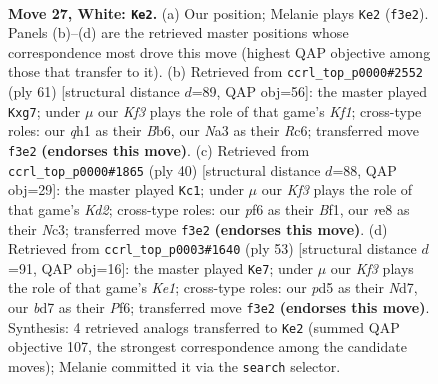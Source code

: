 \documentclass[11pt]{article}
\begin{document}
\clearpage

\begin{figure}[p]\centering
\begin{subfigure}{0.46\textwidth}\centering
\resizebox{\linewidth}{!}{%
\newchessgame
\chessboard[
  setfen={r3r3/1ppb2kp/5p2/p2p2b1/6P1/NPB1PK2/P4P2/RN5q w - - 1 27},
  showmover=false,
  pgfstyle=straightmove, color=movearrow, markmove={f3-e2}
]}
\caption{}
\end{subfigure}\hfill
\begin{subfigure}{0.46\textwidth}\centering
\resizebox{\linewidth}{!}{%
\newchessgame
\chessboard[
  setfen={5k2/pp3pQ1/1brn3p/3p2p1/P2P3P/1P2B3/5PP1/1B3RK1 b - - 0 31},
  showmover=false,
  pgfstyle=straightmove, color=movearrow, markmove={f8-g7}
]}
\caption{}
\end{subfigure}
\\[4pt]
\begin{subfigure}{0.46\textwidth}\centering
\resizebox{\linewidth}{!}{%
\newchessgame
\chessboard[
  setfen={r2r2k1/2R2pp1/p3b3/4n1Pp/4P3/2N4P/P1PK4/5B1R w - - 5 21},
  showmover=false,
  pgfstyle=straightmove, color=movearrow, markmove={d2-c1}
]}
\caption{}
\end{subfigure}\hfill
\begin{subfigure}{0.46\textwidth}\centering
\resizebox{\linewidth}{!}{%
\newchessgame
\chessboard[
  setfen={b3k2r/3n2p1/4pp2/1N1pn2p/2P2B2/6PP/2P5/2KRR3 b k - 0 27},
  showmover=false,
  pgfstyle=straightmove, color=movearrow, markmove={e8-e7}
]}
\caption{}
\end{subfigure}
\caption{\textbf{Move 27, White: \texttt{Ke2}.} (a) Our position; Melanie plays \texttt{Ke2} (\texttt{f3e2}). Panels (b)--(d) are the retrieved master positions whose correspondence most drove this move (highest QAP objective among those that transfer to it). (b) Retrieved from \texttt{ccrl\_top\_p0000\#2552} (ply 61) [structural distance $d$=89, QAP obj=56]: the master played \texttt{Kxg7}; under $\mu$ our \emph{Kf3} plays the role of that game's \emph{Kf1}; cross-type roles: our \emph{q}h1 as their \emph{B}b6, our \emph{N}a3 as their \emph{R}c6; transferred move \texttt{f3e2} \textbf{(endorses this move)}. (c) Retrieved from \texttt{ccrl\_top\_p0000\#1865} (ply 40) [structural distance $d$=88, QAP obj=29]: the master played \texttt{Kc1}; under $\mu$ our \emph{Kf3} plays the role of that game's \emph{Kd2}; cross-type roles: our \emph{p}f6 as their \emph{B}f1, our \emph{r}e8 as their \emph{N}c3; transferred move \texttt{f3e2} \textbf{(endorses this move)}. (d) Retrieved from \texttt{ccrl\_top\_p0003\#1640} (ply 53) [structural distance $d$=91, QAP obj=16]: the master played \texttt{Ke7}; under $\mu$ our \emph{Kf3} plays the role of that game's \emph{Ke1}; cross-type roles: our \emph{p}d5 as their \emph{N}d7, our \emph{b}d7 as their \emph{P}f6; transferred move \texttt{f3e2} \textbf{(endorses this move)}. Synthesis: 4 retrieved analogs transferred to \texttt{Ke2} (summed QAP objective 107, the strongest correspondence among the candidate moves); Melanie committed it via the \texttt{search} selector.}
\label{fig:thought-m52}
\end{figure}
\end{document}
